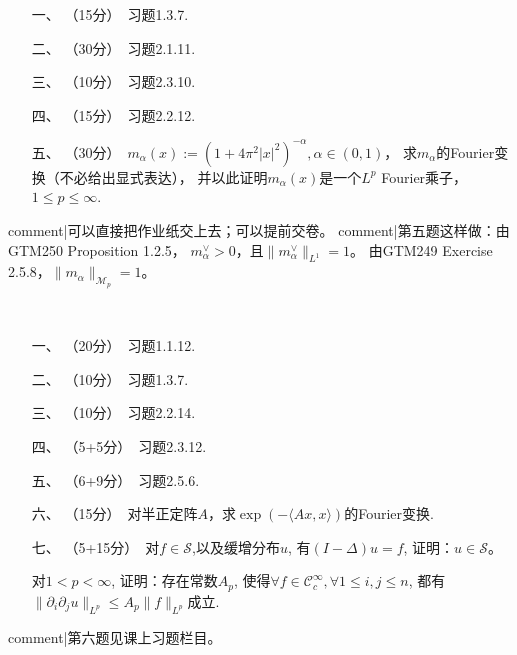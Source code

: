 \begin{center}\end{center}
\begin{itemize}
    \item[一、]（15分）\ 习题1.3.7.
    \item[二、]（30分）\ 习题2.1.11.
    \item[三、]（10分）\ 习题2.3.10.
    \item[四、]（15分）\ 习题2.2.12.
    \item[五、]（30分）\ $m_\alpha(x):=(1+4\pi^2\vert x\vert ^2)^{-\alpha},\alpha\in(0,1)$，
    求$m_\alpha$的Fourier变换（不必给出显式表达），
    并以此证明$m_\alpha(x)$是一个$L^p$ Fourier乘子，$1\leqslant p\leqslant\infty$.
\end{itemize}
{{comment|可以直接把作业纸交上去；可以提前交卷。}}
{{comment|第五题这样做：由GTM250 Proposition 1.2.5，
$m_\alpha^\vee>0$，且$\|m_\alpha^\vee\|_{L^1}=1$。
由GTM249 Exercise 2.5.8，$\|m_\alpha\|_{\mathscr{M}_p}=1$。}}

~\\

\begin{center}\end{center}
\begin{itemize}
    \item[一、]（20分）\ 习题1.1.12.
    \item[二、]（10分）\ 习题1.3.7.
    \item[三、]（10分）\ 习题2.2.14.
    \item[四、]（5+5分）\ 习题2.3.12.
    \item[五、]（6+9分）\ 习题2.5.6.
    \item[六、]（15分）\ 对半正定阵$ A $，求$ \exp(-\langle Ax,x\rangle) $的Fourier变换.
    \item[七、]（5+15分）\ 对$ f\in\mathcal{S} $,以及缓增分布$ u $, 
    有$ (I-\Delta)u=f $, 证明：$ u\in\mathcal{S} $。
    
    对$ 1<p<\infty $, 证明：存在常数$ A_{p} $, 
    使得$ \forall f \in \mathcal{C} _{c}^{\infty} , \forall 1\le i,j \le n $, 
    都有$ \| \partial_{i}\partial_{j}u \|_{L^p} \le A_{p} \| f \|_{L^p} $成立.
\end{itemize}
{{comment|第六题见课上习题栏目。}}